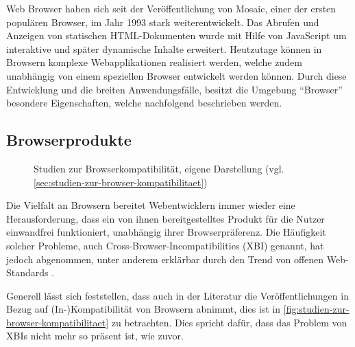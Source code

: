 Web Browser haben sich seit der Veröffentlichung von Mosaic, einer der ersten populären Browser, im Jahr 1993 stark weiterentwickelt. Das Abrufen und Anzeigen von statischen HTML-Dokumenten wurde mit Hilfe von JavaScript um interaktive und später dynamische Inhalte erweitert. Heutzutage können in Browsern komplexe Webapplikationen realisiert werden, welche zudem unabhängig von einem speziellen Browser entwickelt werden können. Durch diese Entwicklung und die breiten Anwendungsfälle, besitzt die Umgebung \enquote{Browser} besondere Eigenschaften, welche nachfolgend beschrieben werden.

\subsection{Browserprodukte}
\label{sec:browserprodukte}

\begin{wrapfigure}[19]{r}{0.45\textwidth}
\centering
{}
\caption{Studien zur Browserkompatibilität, eigene Darstellung (vgl. \ref{sec:studien-zur-browser-kompatibilitaet})}
\label{fig:studien-zur-browser-kompatibilitaet}
\end{wrapfigure}

Die Vielfalt an Browsern bereitet Webentwicklern immer wieder eine Herausforderung, dass ein von ihnen bereitgestelltes Produkt für die Nutzer einwandfrei funktioniert, unabhängig ihrer Browserpräferenz. Die Häufigkeit solcher Probleme, auch Cross-Browser-Incompatibilities (XBI) genannt, hat jedoch abgenommen, unter anderem erklärbar durch den Trend von offenen Web-Standards \cite{W3CStandards}.

Generell lässt sich feststellen, dass auch in der Literatur die Veröffentlichungen in Bezug auf (In-)Kompatibilität von Browsern abnimmt, dies ist in \autoref{fig:studien-zur-browser-kompatibilitaet} zu betrachten. Dies spricht dafür, dass das Problem von XBIs nicht mehr so präsent ist, wie zuvor.

